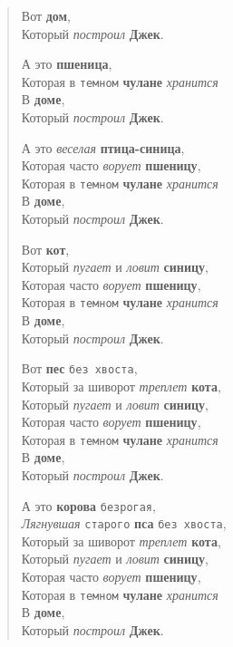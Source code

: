 \begin{verse}
Вот \textbf{дом}, \\
Который \textit{построил} \textbf{Джек}.

А это \textbf{пшеница}, \\
Которая в \texttt{темном} \textbf{чулане} \textit{хранится} \\
В \textbf{доме}, \\
Который \textit{построил} \textbf{Джек}.

А это \textit{веселая} \textbf{птица-синица}, \\
Которая часто \textit{ворует} \textbf{пшеницу}, \\
Которая в \texttt{темном} \textbf{чулане} \textit{хранится} \\
В \textbf{доме}, \\
Который \textit{построил} \textbf{Джек}.

Вот \textbf{кот}, \\
Который \textit{пугает} и \textit{ловит} \textbf{синицу}, \\
Которая часто \textit{ворует} \textbf{пшеницу}, \\
Которая в \texttt{темном} \textbf{чулане} \textit{хранится} \\
В \textbf{доме}, \\
Который \textit{построил} \textbf{Джек}.

Вот \textbf{пес} \texttt{без хвоста}, \\
Который за шиворот \textit{треплет} \textbf{кота}, \\
Который \textit{пугает} и \textit{ловит} \textbf{синицу}, \\
Которая часто \textit{ворует} \textbf{пшеницу}, \\
Которая в \texttt{темном} \textbf{чулане} \textit{хранится} \\
В \textbf{доме}, \\
Который \textit{построил} \textbf{Джек}.

А это \textbf{корова} \texttt{безрогая}, \\
\textit{Лягнувшая} \texttt{старого} \textbf{пса} \texttt{без хвоста}, \\
Который за шиворот \textit{треплет} \textbf{кота}, \\
Который \textit{пугает} и \textit{ловит} \textbf{синицу}, \\
Которая часто \textit{ворует} \textbf{пшеницу}, \\
Которая в \texttt{темном} \textbf{чулане} \textit{хранится} \\
В \textbf{доме}, \\
Который \textit{построил} \textbf{Джек}.


\end{verse}
